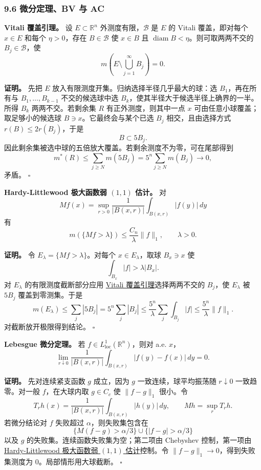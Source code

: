 \documentclass[
UTF8]{ctexart}
\newcommand{\impA}{\hspace{0.4em}{\small\textcolor{impAColor}{\textbf{[A 核心]}}}}
\newcommand{\impB}{\hspace{0.4em}{\small\textcolor{impBColor}{\textbf{[B 重要]}}}}
\newcommand{\thmlabel}[1]{\phantomsection\label{#1}}
\newcommand{\thmref}[2]{\hyperref[#1]{#2}}
\begin{document}
\subsubsection{9.6 微分定理、BV 与 AC}\label{ux5faeux5206ux5b9aux7406bv-ux4e0e-acux8bc1ux660e}

\thmlabel{thm:vitali}\textbf{Vitali 覆盖引理。}\impA
设 \(E\subset\mathbb R^n\) 外测度有限，\(\mathcal B\) 是 \(E\) 的 Vitali 覆盖，即对每个
\(x\in E\) 和每个 \(\eta>0\)，存在 \(B\in\mathcal B\) 使
\(x\in B\) 且 \(\operatorname{diam}B<\eta\)。则可取两两不交的
\(B_j\in\mathcal B\)，使
\[
  m\left(E\setminus\bigcup_{j=1}^{\infty}B_j\right)=0.
\]

\textbf{证明。} 先把 \(E\) 放入有限测度开集。归纳选择半径几乎最大的球：选 \(B_1\)，再在所有与
\(B_1,\dots,B_{k-1}\) 不交的候选球中选 \(B_k\)，使其半径大于候选半径上确界的一半。所得
\(B_k\) 两两不交。若剩余集 \(R\) 有正外测度，则其中一点 \(x\) 可由任意小球覆盖；取足够小的候选球
\(B\ni x\)。它最终会与某个已选 \(B_j\) 相交，且由选择方式 \(r(B)\le2r(B_j)\)，于是
\[
  B\subset 5B_j.
\]
因此剩余集被选中球的五倍放大覆盖。若剩余测度不为零，可在尾部得到
\[
  m^*(R)\le \sum_{j\ge N}m(5B_j)=5^n\sum_{j\ge N}m(B_j)\to0,
\]
矛盾。 \(\square\)

\thmlabel{thm:hl-weak}\textbf{Hardy-Littlewood 极大函数弱 \((1,1)\) 估计。}\impB
对
\[
  Mf(x)=\sup_{r>0}\frac1{|B(x,r)|}\int_{B(x,r)}|f(y)|\,dy
\]
有
\[
  m(\{Mf>\lambda\})\le \frac{C_n}{\lambda}\|f\|_1,\qquad \lambda>0.
\]

\textbf{证明。} 令 \(E_\lambda=\{Mf>\lambda\}\)。对每个 \(x\in E_\lambda\)，取球
\(B_x\ni x\) 使
\[
  \int_{B_x}|f|>\lambda |B_x|.
\]
对 \(E_\lambda\) 的有限测度截断部分应用
\thmref{thm:vitali}{Vitali 覆盖引理}选择两两不交的 \(B_j\)，使
\(E_\lambda\) 被 \(5B_j\) 覆盖到零测集。于是
\[
  m(E_\lambda)\le\sum_j|5B_j|
  =5^n\sum_j|B_j|
  \le \frac{5^n}{\lambda}\sum_j\int_{B_j}|f|
  \le\frac{5^n}{\lambda}\|f\|_1.
\]
对截断放开极限得到结论。 \(\square\)

\thmlabel{thm:lebesgue-diff}\textbf{Lebesgue 微分定理。}\impA
若 \(f\in L^1_{\mathrm{loc}}(\mathbb R^n)\)，则对 a.e. \(x\)，
\[
  \lim_{r\downarrow0}\frac1{|B(x,r)|}\int_{B(x,r)}|f(y)-f(x)|\,dy=0.
\]

\textbf{证明。} 先对连续紧支函数 \(g\) 成立，因为 \(g\) 一致连续，球平均振荡随 \(r\downarrow0\) 一致趋零。对一般
\(f\)，在大球内取 \(g\in C_c\) 使 \(\|f-g\|_1\) 很小。令
\[
  T_rh(x)=\frac1{|B(x,r)|}\int_{B(x,r)}|h(y)|\,dy,\qquad Mh=\sup_rT_rh.
\]
若微分结论对 \(f\) 失败超过 \(\alpha\)，则失败集包含在
\[
  \{M(f-g)>\alpha/3\}\cup\{|f-g|>\alpha/3\}
\]
以及 \(g\) 的失败集。连续函数失败集为空；第二项由 Chebyshev 控制，第一项由
\thmref{thm:hl-weak}{Hardy-Littlewood 极大函数弱 \((1,1)\) 估计}控制。令
\(\|f-g\|_1\to0\)，得到失败集测度为 \(0\)。局部情形用大球截断。 \(\square\)
\end{document}
